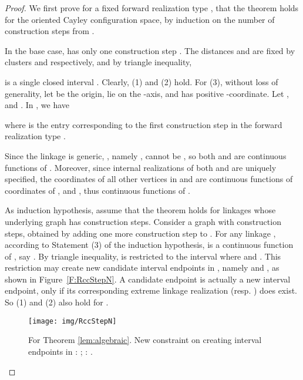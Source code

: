 \documentclass[secthm,amsthm,english]{article}
\theoremstyle{definition}
\theoremstyle{remark}
\begin{document}
\begin{proof} 
We first prove for a fixed forward realization type ,  
that the theorem holds for the oriented Cayley configuration space, 
by induction on the number of construction steps from . 

In the base case,  has only one construction step .
The distances  and  are
fixed by clusters  and  respectively, 
and by triangle inequality, 

is a single closed interval . 
Clearly,  (1) and (2) hold. 
For (3),  without loss of generality, 
let  be the origin,  lie on the -axis, 
and  has positive -coordinate. 
Let ,
 and .
In , we have



where  is the entry corresponding to the first construction step in the forward realization type .  

Since the linkage is generic, , namely , cannot be , 
so both  and  are continuous functions of . 
Moreover, since internal realizations of both  and  are uniquely specified, 
the coordinates of all other vertices in  and  are continuous functions
of coordinates of ,  and , thus continuous
functions of . 

\smallskip{}




As induction hypothesis, 
assume that the theorem holds for linkages whose underlying graph  has  construction steps.
Consider a graph  with  construction steps, 
obtained by adding one more construction step 
to . 
For any linkage , according to Statement (3) of the induction hypothesis, 
 is a continuous function of , say . 
By triangle inequality,   is restricted to the interval 
where  and .
This restriction may create new candidate interval endpoints in ,
namely  and , as shown in Figure~\ref{F:RccStepN}. 
A candidate endpoint is actually a new interval endpoint, 
only if its corresponding extreme linkage realization 
 (resp. ) does exist. 
So (1) and (2) also hold for .

\begin{figure}[h]
	 
	
	\begin{centering}
	\texttt{[image: img/RccStepN]} 
	\par\end{centering}
	
	\caption{For Theorem \ref{lem:algebraic}. New constraint on 
	creating interval endpoints in  :
	; { } : . }


\end{figure}
\end{proof}
\end{document}
